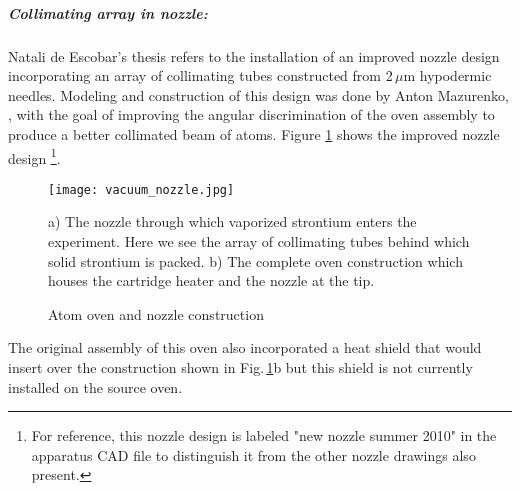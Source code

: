 \subparagraph{Collimating array in nozzle:}
Natali de Escobar's thesis refers to the installation of an improved nozzle design incorporating an array of collimating tubes constructed from 2\,$\mu$m hypodermic needles. 
Modeling and construction of this design was done by Anton Mazurenko, \cite{Mazurenko2010}, with the goal of improving the angular discrimination of the oven assembly to produce a better collimated beam of atoms.
Figure \ref{fig:2010_nozzle} shows the improved nozzle design \footnote{For reference, this nozzle design is labeled "new nozzle summer 2010" in the apparatus CAD file to distinguish it from the other nozzle drawings also present.}.
	\begin{figure}
		\centerline{
		\texttt{[image: vacuum\_nozzle.jpg]}}
		\caption{Atom oven and nozzle construction}{a) The nozzle through which vaporized strontium enters the experiment. Here we see the array of collimating tubes behind which solid strontium is packed. b) The complete oven construction which houses the cartridge heater and the nozzle at the tip.}
		\label{fig:2010_nozzle}
	\end{figure}
The original assembly of this oven also incorporated a heat shield that would insert over the construction shown in Fig.\,\ref{fig:2010_nozzle}b but this shield is not currently installed on the source oven.
 
